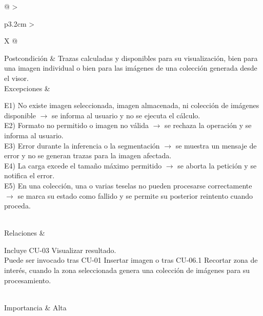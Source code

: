 \begin{table}[]
\begin{tabularx}{\textwidth}{@{}
			>{\raggedright\arraybackslash}p{3.2cm}
			>{\raggedright\arraybackslash}X
			@{}}
		Postcondición &
		Trazas calculadas y disponibles para su visualización, bien para una imagen individual o bien para las imágenes de una colección generada desde el visor. \\
		
		Excepciones &
		\begin{minipage}[t]{\linewidth}
			\vspace{-\baselineskip}
			E1) No existe imagen seleccionada, imagen almacenada, ni colección de imágenes disponible $\rightarrow$ se informa al usuario y no se ejecuta el cálculo.\\
			E2) Formato no permitido o imagen no válida $\rightarrow$ se rechaza la operación y se informa al usuario.\\
			E3) Error durante la inferencia o la segmentación $\rightarrow$ se muestra un mensaje de error y no se generan trazas para la imagen afectada.\\
			E4) La carga excede el tamaño máximo permitido $\rightarrow$ se aborta la petición y se notifica el error.\\
			E5) En una colección, una o varias teselas no pueden procesarse correctamente $\rightarrow$ se marca su estado como fallido y se permite su posterior reintento cuando proceda.
		\end{minipage} \\
		
		Relaciones &
		\begin{minipage}[t]{\linewidth}
			\vspace{-\baselineskip}
			Incluye CU-03 Visualizar resultado.\\
			Puede ser invocado tras CU-01 Insertar imagen o tras CU-06.1 Recortar zona de interés, cuando la zona seleccionada genera una colección de imágenes para su procesamiento.
		\end{minipage} \\
		
		Importancia &
		Alta \\
		\bottomrule
	\end{tabularx}
\end{table}

